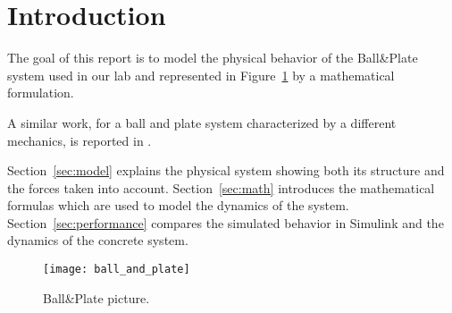 \section{Introduction}

The goal of this report is to model the physical behavior of the Ball\&Plate
system used in our lab and represented in Figure~\ref{fig:picture} by a 
mathematical formulation.

A similar work, for a ball and plate system characterized by a different
mechanics, is reported in \cite{AC2000, website:awtar}.

Section~\ref{sec:model} explains the physical system showing both its structure
and the forces taken into account.
Section~\ref{sec:math} introduces the mathematical formulas which are used to
model the dynamics of the system.
Section~\ref{sec:performance} compares the simulated behavior in Simulink
\cite{website:simulink} and the dynamics of the concrete system.

\begin{figure}[htb]
  \centering
  \texttt{[image: ball\_and\_plate]}
  \caption{Ball\&Plate picture.}
  \label{fig:picture}
\end{figure}
